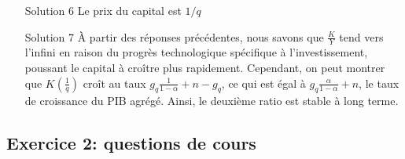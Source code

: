 \documentclass{article}
\begin{document}
\begin{enumerate}
        
    \item[Solution 6] Le prix du capital est $1/q$

    \item[Solution 7]  À partir des réponses précédentes, nous savons que \( \frac{K}{Y} \) tend vers l'infini en raison du progrès technologique spécifique à l'investissement, poussant le capital à croître plus rapidement. Cependant, on peut montrer que \( K \left(\frac{1}{q}\right) \) croît au taux \( g_q \frac{1}{1-\alpha}+n-g_q \), ce qui est égal à \( g_q \frac{\alpha}{1-\alpha}+n \), le taux de croissance du PIB agrégé. Ainsi, le deuxième ratio est stable à long terme.

   
\end{enumerate}


\hypertarget{mcq}{\subsection{Exercice 2: questions de cours}\label{mcq}}
\end{document}
